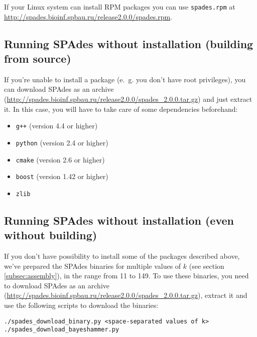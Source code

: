 \documentclass{article}
\def\spades{SPAdes}
\begin{document}
If your Linux system can install RPM packages you can use {\tt spades.rpm}
at \url{http://spades.bioinf.spbau.ru/release2.0.0/spades.rpm}.

\subsection{Running {\spades} without installation (building from source)}\label{subsec:archive}

If you're unable to install a package (e.~g. you don't have root privileges),
you can download {\spades} as an archive (\url{http://spades.bioinf.spbau.ru/release2.0.0/spades_2.0.0.tar.gz}) and just extract it.
In this case, you will have to take care of some dependencies beforehand:
\begin{itemize}
\item {\tt g++} (version 4.4 or higher)
\item {\tt python} (version 2.4 or higher)
\item {\tt cmake} (version 2.6 or higher)
\item {\tt boost} (version 1.42 or higher)
\item {\tt zlib}
\end{itemize}

\subsection{Running {\spades} without installation (even without building)}\label{subsec:binaries}

If you don't have possibility to install some of the packages described above,
we've prepared the {\spades} binaries for multiple values of $k$ (see section \ref{subsec:assembly}),
in the range from 11 to 149.
To use these binaries, you need to download {\spades} as an archive (\url{http://spades.bioinf.spbau.ru/release2.0.0/spades_2.0.0.tar.gz}),
extract it and use the following scripts to download the binaries:
\begin{lstlisting}
./spades_download_binary.py <space-separated values of k>
./spades_download_bayeshammer.py
\end{lstlisting}
\end{document}
